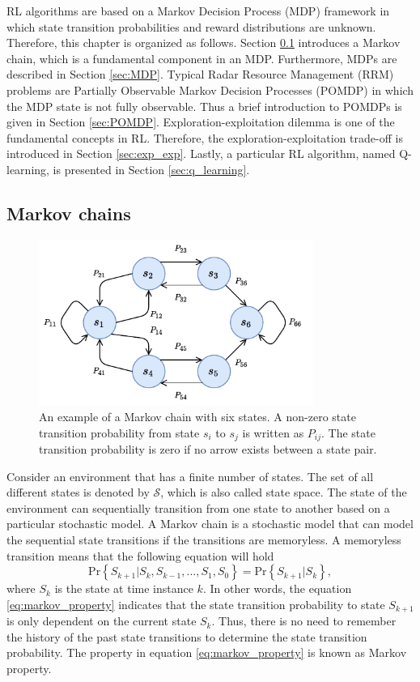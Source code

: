 \documentclass[english, 12pt, a4paper, elec, utf8, a-1b, online]{aaltothesis}
\numberwithin{equation}{section}
\newcommand{\Ss}{\mathcal{S}}
\renewcommand{\Pr}[1]{\text{Pr}\left\{ #1 \right\}}
\begin{document}
RL algorithms are based on a Markov Decision Process (MDP) framework in which state transition probabilities and reward distributions are unknown.
Therefore, this chapter is organized as follows.
Section \ref{sec:MC} introduces a Markov chain, which is a fundamental component in an MDP.
Furthermore, MDPs are described in Section \ref{sec:MDP}.
Typical Radar Resource Management (RRM) problems are Partially Observable Markov Decision Processes (POMDP) in which the MDP state is not fully observable. 
Thus a brief introduction to POMDPs is given in Section \ref{sec:POMDP}.
Exploration-exploitation dilemma is one of the fundamental concepts in RL. Therefore, the exploration-exploitation trade-off is introduced in Section \ref{sec:exp_exp}. 
Lastly, a particular RL algorithm, named Q-learning, is presented in Section \ref{sec:q_learning}.


\subsection{Markov chains} \label{sec:MC}

\begin{figure}[b]
    \centering
    \includegraphics[width=0.8\textwidth]{figures/MarkovChain.pdf}
    \caption{
    An example of a Markov chain with six states. 
    A non-zero state transition probability from state $s_i$ to $s_j$ is written as $P_{ij}$.
    The state transition probability is zero if no arrow exists between a state pair. }
    \label{fig:mc}
\end{figure}


Consider an environment that has a finite number of states.
The set of all different states is denoted by $\Ss$, which is also called state space.
The state of the environment can sequentially transition from one state to another based on a particular stochastic model.
A Markov chain is a stochastic model that can model the sequential state transitions if the transitions are memoryless.
A memoryless transition means that the following equation will hold   
\begin{equation} \label{eq:markov_property}
    \Pr{S_{k+1} | S_k, S_{k-1}, ..., S_1, S_0} = \Pr{S_{k+1} | S_k},
\end{equation}
where $S_k$ is the state at time instance $k$.
In other words, the equation \eqref{eq:markov_property} indicates that the state transition probability to state $S_{k+1}$ is only dependent on the current state $S_k$.
Thus, there is no need to remember the history of the past state transitions to determine the state transition probability.
The property in equation \eqref{eq:markov_property} is known as Markov property.
\end{document}
